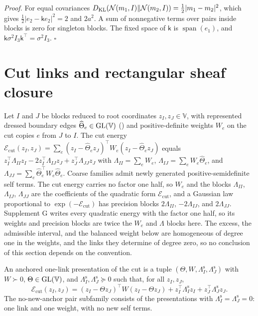 \noindent\emph{Proof.}
For equal covariances $D_{\mathrm{KL}}(\mathcal N(m_1,I)\Vert\mathcal N(m_2,I))=\tfrac12\lvert m_1-m_2\rvert^2$, which
gives $\tfrac12\lvert e_2-\mathsf ke_2\rvert^2=2$ and $2a^2$. A sum of nonnegative terms over pairs inside
blocks is zero for singleton blocks. The fixed space of $\mathsf k$ is $\operatorname{span}(e_1)$, and
$\mathsf k\sigma^2I_3\mathsf k^\top=\sigma^2I_3$. $\square$

\section{Cut links and rectangular sheaf closure}
\label{sec:cg-sheaf-closure}

Let $I$ and $J$ be blocks reduced to root coordinates $z_I,z_J\in \mathbb V$, with represented dressed boundary
edges $\widehat\Theta_e\in\mathrm{GL}(\mathbb V)$ () and positive-definite weights $W_e$ on
the cut copies $e$ from $J$ to $I$. The cut energy
$\mathcal E_{\mathrm{cut}}(z_I,z_J)=\sum_e(z_I-\widehat\Theta_ez_J)^\top W_e(z_I-\widehat\Theta_ez_J)$
equals $z_I^\top\Lambda_{II}z_I-2z_I^\top\Lambda_{IJ}z_J+z_J^\top\Lambda_{JJ}z_J$ with
$\Lambda_{II}=\sum_eW_e$, $\Lambda_{IJ}=\sum_eW_e\widehat\Theta_e$, and
$\Lambda_{JJ}=\sum_e\widehat\Theta_e^\top W_e\widehat\Theta_e$. Coarse families admit newly generated
positive-semidefinite self terms. The cut energy carries no factor one half, so $W_e$ and the blocks
$\Lambda_{II}$, $\Lambda_{IJ}$, $\Lambda_{JJ}$ are the coefficients of the quadratic form
$\mathcal E_{\mathrm{cut}}$, and a Gaussian law proportional to $\exp(-\mathcal E_{\mathrm{cut}})$ has
precision blocks $2\Lambda_{II}$, $-2\Lambda_{IJ}$, and $2\Lambda_{JJ}$. Supplement G writes every
quadratic energy with the factor one half, so its weights and precision blocks are twice the $W_e$
and $\Lambda$ blocks here. The excess, the admissible interval, and the balanced weight below are
homogeneous of degree one in the weights, and the links they determine of degree zero, so no
conclusion of this section depends on the convention.

An anchored one-link presentation of the cut is a tuple $(\Theta,W,\Lambda^{\mathrm s}_I,\Lambda^{\mathrm s}_J)$
with $W\succ0$, $\Theta\in\mathrm{GL}(\mathbb V)$, and $\Lambda^{\mathrm s}_I,\Lambda^{\mathrm s}_J\succeq0$ such that, for all
$z_I,z_J$,
\begin{equation}
\mathcal E_{\mathrm{cut}}(z_I,z_J)=(z_I-\Theta z_J)^\top W(z_I-\Theta z_J)
+z_I^\top\Lambda^{\mathrm s}_Iz_I+z_J^\top\Lambda^{\mathrm s}_Jz_J.
\label{eq:cg-cut-anchored-link}
\end{equation}
The no-new-anchor pair subfamily consists of the presentations with
$\Lambda^{\mathrm s}_I=\Lambda^{\mathrm s}_J=0$: one link and one weight, with no new self terms.

